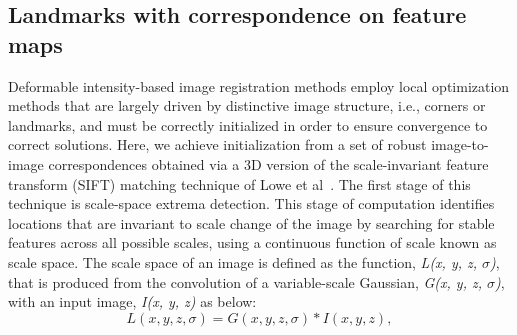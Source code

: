 \documentclass{llncs}
\begin{document}
%

\subsection{Landmarks with correspondence on feature maps}
\label{subsec:Correspondence}
Deformable intensity-based image registration methods employ local optimization methods that are largely driven by distinctive image structure, i.e., corners or landmarks, and must be correctly initialized in order to ensure convergence to correct solutions. Here, we achieve initialization from a set of robust image-to-image correspondences obtained via a 3D version of the scale-invariant feature transform (SIFT) matching technique of Lowe et al~\cite{Lowe:04}. The first stage of this technique is scale-space extrema detection. This stage of computation identifies locations that are invariant to scale change of the image by searching for stable features across all possible scales, using a continuous function of scale known as scale space. The scale space of an image is defined as the function, \textit{L(x, y, z, $\sigma$)}, that is produced from the convolution of a variable-scale Gaussian, \textit{G(x, y, z, $\sigma$)}, with an input image, \textit{I(x, y, z)} as below:
\begin{equation}
    L(x, y, z, \sigma) = G(x, y, z, \sigma) * I(x, y, z),
\end{equation}
\end{document}
